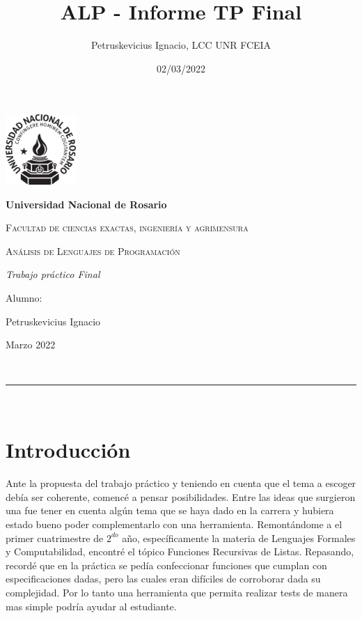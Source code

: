 \documentclass[a4paper,13pt,proof]{article}
\makeatletter
\newcommand{\linia}{\rule{\linewidth}{0.5pt}}
\theoremstyle{mytheor}
\renewcommand{\maketitle}{
\begin{center}
\vspace{2ex}
{\huge \textsc{\@title}}
\vspace{1ex}
\\
\linia\\
\@author \hfill \@date
\vspace{4ex}
\end{center}
}
\makeatother
\begin{document}
\begin{titlepage}
\centering
{\includegraphics[width=0.2\textwidth]{logo-unr.png}\par}
\vspace{1cm}
{\bfseries\LARGE Universidad Nacional de Rosario \par}
\vspace{1cm}
{\scshape\Large Facultad de ciencias exactas, ingeniería y agrimensura \par}
\vspace{3cm}
{\scshape\Huge Análisis de Lenguajes de Programación \par}
\vspace{3cm}
{\itshape\Large Trabajo pr\'actico Final \par}
\vfill
{\Large Alumno: \par}
{\Large Petruskevicius Ignacio\par}
\vfill
{\Large Marzo 2022 \par}
\end{titlepage}


\title{ALP - Informe TP Final}

\author{Petruskevicius Ignacio, LCC UNR FCEIA}

\date{02/03/2022}

\maketitle


\section{Introducción}


Ante la propuesta del trabajo práctico y teniendo en cuenta que el tema a escoger debía ser coherente, comencé a pensar posibilidades. Entre las ideas que surgieron una fue tener en cuenta algún tema que se haya dado en la carrera y hubiera estado bueno poder complementarlo con una herramienta. Remontándome a el primer cuatrimestre de $2^{do}$ año, específicamente la materia de Lenguajes Formales y Computabilidad, encontré el tópico Funciones Recursivas de Listas. Repasando, recordé que en la práctica se pedía confeccionar funciones que cumplan con especificaciones dadas, pero las cuales eran difíciles de corroborar dada su complejidad. Por lo tanto una herramienta que permita realizar tests de manera mas simple podría ayudar al estudiante.
\end{document}
